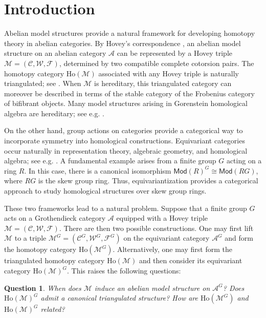 \documentclass[12pt,twoside]{amsart}
\newtheorem{intque}{Question}[]
\theoremstyle{bfupright head,slanted body}
\theoremstyle{bfupright head,upright body}
\theoremstyle{fixed bf head,slanted body}
\theoremstyle{fixed bf head,upright body}
\theoremstyle{numbered paragraph}
\numberwithin{equation}{res}
\newcommand{\calC}{\mathcal{C}}
\newcommand{\calW}{\mathcal{W}}
\newcommand{\calF}{\mathcal{F}}
\newcommand{\calA}{\mathcal{A}}
\newcommand{\calM}{\mathcal{M}}
\newcommand{\Mod}{\mathsf{Mod}}
\newcommand{\Ho}{\mathrm{Ho}}
\begin{document}
\maketitle
	\tableofcontents

\section*{Introduction}\label{Introduction}%
\noindent
Abelian model structures provide a natural framework for developing homotopy theory in abelian categories.
By Hovey's correspondence \cite{HOVEY2002}, an abelian model structure on an abelian category $\calA$ can be represented by a Hovey triple $\calM=(\calC,\calW,\calF)$, determined by two compatible complete cotorsion pairs.
The homotopy category $\Ho(\calM)$ associated with any Hovey triple is naturally triangulated; see \cite[Section 6]{2025GillBook}.
When $\calM$ is hereditary, this triangulated category can moreover be described in terms of the stable category of the Frobenius category of bifibrant objects.
Many model structures arising in Gorenstein homological algebra are hereditary; see e.g. \cite{2016Gill,HOVEY2002,2020Sto}.

On the other hand, group actions on categories provide a categorical way to incorporate symmetry into homological constructions.
Equivariant categories occur naturally in representation theory, algebraic geometry, and homological algebra; see e.g. \cite{JV94,2015Chen,2017Chen,2010DGNO,2014Elag,2019Sun}.
A fundamental example arises from a finite group $G$ acting on a ring $R$.
In this case, there is a canonical isomorphism $\Mod(R)^G\cong\Mod(RG)$, where $RG$ is the skew group ring.
Thus, equivariantization provides a categorical approach to study homological structures over skew group rings.

These two frameworks lead to a natural problem.
Suppose that a finite group $G$ acts on a Grothendieck category $\calA$ equipped with a Hovey triple $\calM=(\calC,\calW,\calF)$.
There are then two possible constructions.
One may first lift $\calM$ to a triple $\calM^G=(\calC^G,\calW^G,\calF^G)$ on the equivariant category $\calA^G$ and form the homotopy category $\Ho(\calM^G)$.
Alternatively, one may first form the triangulated homotopy category $\Ho(\calM)$ and then consider its equivariant category $\Ho(\calM)^G$.
This raises the following questions:
\begin{intque}\label{quea}
When does $\calM$ induce an abelian model structure on $\calA^G$?
Does $\Ho(\calM)^G$ admit a canonical triangulated structure?
How are $\Ho(\calM^G)$ and $\Ho(\calM)^G$ related?
\end{intque}
\end{document}
